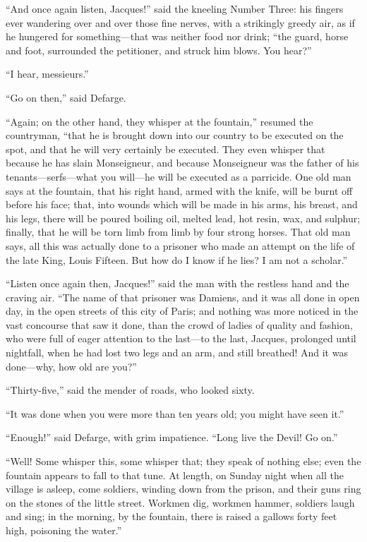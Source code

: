 ``And once again listen, Jacques!'' said the kneeling Number Three:
his fingers ever wandering over and over those fine nerves, with a
strikingly greedy air, as if he hungered for something---that was
neither food nor drink; ``the guard, horse and foot, surrounded
the petitioner, and struck him blows.  You hear?''

``I hear, messieurs.''

``Go on then,'' said Defarge.

``Again; on the other hand, they whisper at the fountain,'' resumed the
countryman, ``that he is brought down into our country to be executed
on the spot, and that he will very certainly be executed.  They even
whisper that because he has slain Monseigneur, and because Monseigneur
was the father of his tenants---serfs---what you will---he will be
executed as a parricide.  One old man says at the fountain, that his
right hand, armed with the knife, will be burnt off before his face;
that, into wounds which will be made in his arms, his breast,
and his legs, there will be poured boiling oil, melted lead, hot resin,
wax, and sulphur; finally, that he will be torn limb from limb by four
strong horses.  That old man says, all this was actually done to a
prisoner who made an attempt on the life of the late King,
Louis Fifteen.  But how do I know if he lies?  I am not a scholar.''

``Listen once again then, Jacques!'' said the man with the restless hand
and the craving air.  ``The name of that prisoner was Damiens, and it
was all done in open day, in the open streets of this city of Paris;
and nothing was more noticed in the vast concourse that saw it done,
than the crowd of ladies of quality and fashion, who were full of eager
attention to the last---to the last, Jacques, prolonged until nightfall,
when he had lost two legs and an arm, and still breathed!  And it
was done---why, how old are you?''

``Thirty-five,'' said the mender of roads, who looked sixty.

``It was done when you were more than ten years old; you might
have seen it.''

``Enough!'' said Defarge, with grim impatience.  ``Long live the Devil!
Go on.''

``Well!  Some whisper this, some whisper that; they speak of nothing else;
even the fountain appears to fall to that tune.  At length, on Sunday
night when all the village is asleep, come soldiers, winding down from
the prison, and their guns ring on the stones of the little street.
Workmen dig, workmen hammer, soldiers laugh and sing; in the morning,
by the fountain, there is raised a gallows forty feet high, poisoning
the water.''

